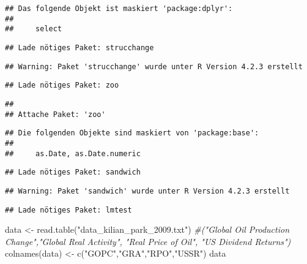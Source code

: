 \documentclass[
]{article}
\newenvironment{Shaded}{\begin{snugshade}}{\end{snugshade}}
\newcommand{\CommentTok}[1]{\textcolor[rgb]{0.56,0.35,0.01}{\textit{#1}}}
\newcommand{\FunctionTok}[1]{\textcolor[rgb]{0.00,0.00,0.00}{#1}}
\newcommand{\NormalTok}[1]{#1}
\newcommand{\OtherTok}[1]{\textcolor[rgb]{0.56,0.35,0.01}{#1}}
\newcommand{\StringTok}[1]{\textcolor[rgb]{0.31,0.60,0.02}{#1}}
\begin{document}
\begin{verbatim}
## Das folgende Objekt ist maskiert 'package:dplyr':
## 
##     select
\end{verbatim}

\begin{verbatim}
## Lade nötiges Paket: strucchange
\end{verbatim}

\begin{verbatim}
## Warning: Paket 'strucchange' wurde unter R Version 4.2.3 erstellt
\end{verbatim}

\begin{verbatim}
## Lade nötiges Paket: zoo
\end{verbatim}

\begin{verbatim}
## 
## Attache Paket: 'zoo'
\end{verbatim}

\begin{verbatim}
## Die folgenden Objekte sind maskiert von 'package:base':
## 
##     as.Date, as.Date.numeric
\end{verbatim}

\begin{verbatim}
## Lade nötiges Paket: sandwich
\end{verbatim}

\begin{verbatim}
## Warning: Paket 'sandwich' wurde unter R Version 4.2.3 erstellt
\end{verbatim}

\begin{verbatim}
## Lade nötiges Paket: lmtest
\end{verbatim}

\begin{Shaded}
\begin{Highlighting}[]
\NormalTok{data }\OtherTok{\textless{}{-}} \FunctionTok{read.table}\NormalTok{(}\StringTok{"data\_kilian\_park\_2009.txt"}\NormalTok{)}
\CommentTok{\#("Global Oil Production Change","Global Real Activity", "Real Price of Oil", "US Dividend Returns")}
\FunctionTok{colnames}\NormalTok{(data) }\OtherTok{\textless{}{-}} \FunctionTok{c}\NormalTok{(}\StringTok{"GOPC"}\NormalTok{,}\StringTok{"GRA"}\NormalTok{,}\StringTok{"RPO"}\NormalTok{,}\StringTok{"USSR"}\NormalTok{)}
\NormalTok{data}
\end{Highlighting}
\end{Shaded}
\end{document}
